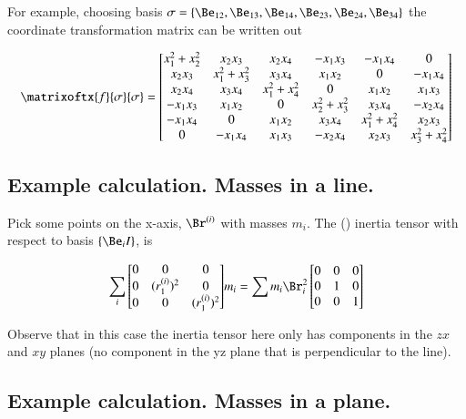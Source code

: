 For example, choosing basis $\sigma = \{ \Be_{12}, \Be_{13}, \Be_{14}, \Be_{23}, \Be_{24}, \Be_{34} \}$ the coordinate transformation matrix can be written out

\[
\matrixoftx{f}{\sigma}{\sigma}
=
\begin{bmatrix}
x_1^2 + x_2^2     &     x_2 x_3      &     x_2 x_4    &     -x_1 x_3      &    -x_1 x_4    &     0 \\
x_2 x_3           & x_1^2 + x_3^2    &     x_3 x_4      &     x_1 x_2    &            0  & -x_1 x_4 \\
x_2 x_4           &  x_3 x_4         & x_1^2 + x_4^2    &         0    &      x_1 x_2    & x_1 x_3 \\
-x_1 x_3          &  x_1 x_2         &          0     & x_2^2 + x_3^2  &      x_3 x_4    & -x_2 x_4 \\
-x_1 x_4          &  0             &     x_1 x_2      &     x_3 x_4    & x_1^2 + x_4^2   & x_2 x_3 \\
   0            &  -x_1 x_4        &     x_1 x_3      &    -x_2 x_4    &      x_2 x_3    &  x_3^2 + x_4^2 \\
\end{bmatrix}
\]

\subsection{Example calculation.  Masses in a line. }

Pick some points on the x-axis, $\Br^{(i)}$ with masses $m_i$.
The () inertia tensor with respect to basis $\{\Be_i I\}$, is

\[
\sum_i {
\begin{bmatrix}
 0 & 0               & 0      \\
 0 & (r^{(i)}_1)^2     & 0      \\
 0 & 0               & (r^{(i)}_1)^2  \\
\end{bmatrix}
} m_i
= \sum{ m_i \Br_i^2}
\begin{bmatrix}
0 & 0 & 0 \\
0 & 1 & 0 \\
0 & 0 & 1 \\
\end{bmatrix}
\]

Observe that in this case the inertia tensor here only has components in the $zx$ and $xy$ planes (no component in the yz plane that is perpendicular to the line).

\subsection{Example calculation.  Masses in a plane. }

